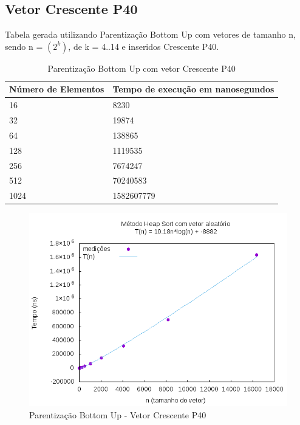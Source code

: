 \documentclass[12pt,a4paper,twoside]{report}
\begin{document}
\subsection{Vetor Crescente P40}
Tabela gerada utilizando Parentização Bottom Up com vetores de tamanho n, sendo n = $(2^k)$, de k = 4..14 e inseridos Crescente P40.
\begin{table}[H]
\centering
\caption{Parentização Bottom Up com vetor Crescente P40}
\label{my-label}
\begin{tabular}{|l|l|}
\hline
\multicolumn{1}{|c|}{\textbf{Número de Elementos}} & \multicolumn{1}{c|}{\textbf{Tempo de execução em nanosegundos}} \\ \hline
16 & 8230 \\ \hline
32 & 19874 \\ \hline
64 & 138865 \\ \hline
128 & 1119535 \\ \hline
256 & 7674247 \\ \hline
512 & 70240583 \\ \hline
1024 & 1582607779 \\ \hline
\end{tabular}
\end{table}

\begin{figure}[H]
    \centering
    \includegraphics[width=0.7\linewidth]{graficos/HeapSort/vIntAleatorio/vIntAleatorio.png}
  \caption{Parentização Bottom Up - Vetor Crescente P40}
\end{figure}
\end{document}
